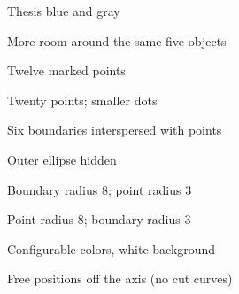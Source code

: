 \documentclass{article}
\begin{document}
\begin{center}
\Large Thesis blue and gray\par\bigskip
{}
\end{center}
\clearpage
\begin{center}
\Large More room around the same five objects\par\bigskip
{}
\end{center}
\clearpage
\begin{center}
\Large Twelve marked points\par\bigskip
{}
\end{center}
\clearpage
\begin{center}
\Large Twenty points; smaller dots\par\bigskip
{}
\end{center}
\clearpage
\begin{center}
\Large Six boundaries interspersed with points\par\bigskip
{}
\end{center}
\clearpage
\begin{center}
\Large Outer ellipse hidden\par\bigskip
{}
\end{center}
\clearpage
\begin{center}
\Large Boundary radius 8; point radius 3\par\bigskip
{}
\end{center}
\clearpage
\begin{center}
\Large Point radius 8; boundary radius 3\par\bigskip
{}
\end{center}
\clearpage
\begin{center}
\Large Configurable colors, white background\par\bigskip
{}
\end{center}
\clearpage
\begin{center}
\Large Free positions off the axis (no cut curves)\par\bigskip
{}
\end{center}
\end{document}
